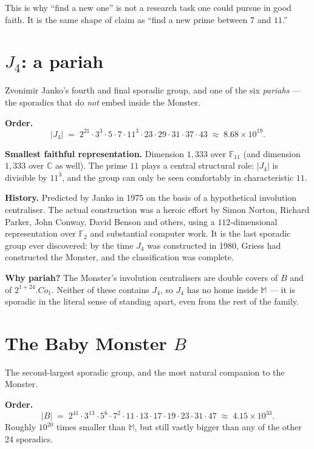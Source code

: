 \documentclass[11pt]{article}
\newcommand{\M}{\mathbb{M}}
\newcommand{\C}{\mathbb{C}}
\begin{document}
This is why ``find a new one'' is not a research task one could pursue
in good faith. It is the same shape of claim as ``find a new prime
between $7$ and $11$.''

\section*{$J_4$: a pariah}

Zvonimir Janko's fourth and final sporadic group, and one of the six
\emph{pariahs} --- the sporadics that do \emph{not} embed inside the
Monster.

\textbf{Order.}
\[
|J_4| \;=\; 2^{21} \cdot 3^3 \cdot 5 \cdot 7 \cdot 11^3 \cdot 23 \cdot 29 \cdot 31 \cdot 37 \cdot 43
\;\approx\; 8.68 \times 10^{19}.
\]

\textbf{Smallest faithful representation.} Dimension $1{,}333$ over
$\mathbb{F}_{11}$ (and dimension $1{,}333$ over $\C$ as well). The
prime $11$ plays a central structural role: $|J_4|$ is divisible by
$11^3$, and the group can only be seen comfortably in characteristic
$11$.

\textbf{History.} Predicted by Janko in 1975 on the basis of a
hypothetical involution centraliser. The actual construction was a
heroic effort by Simon Norton, Richard Parker, John Conway, David
Benson and others, using a $112$-dimensional representation over
$\mathbb{F}_2$ and substantial computer work. It is the last sporadic
group ever discovered: by the time $J_4$ was constructed in 1980,
Griess had constructed the Monster, and the classification was
complete.

\textbf{Why pariah?} The Monster's involution centralisers are
double covers of $B$ and of $2^{1+24}.\mathit{Co}_1$. Neither of
these contains $J_4$, so $J_4$ has no home inside $\M$ --- it is
sporadic in the literal sense of standing apart, even from the rest
of the family.

\section*{The Baby Monster $B$}

The second-largest sporadic group, and the most natural companion to
the Monster.

\textbf{Order.}
\[
|B| \;=\; 2^{41} \cdot 3^{13} \cdot 5^6 \cdot 7^2 \cdot 11 \cdot 13 \cdot 17 \cdot 19 \cdot 23 \cdot 31 \cdot 47
\;\approx\; 4.15 \times 10^{33}.
\]
Roughly $10^{20}$ times smaller than $\M$, but still vastly bigger
than any of the other 24 sporadics.
\end{document}
